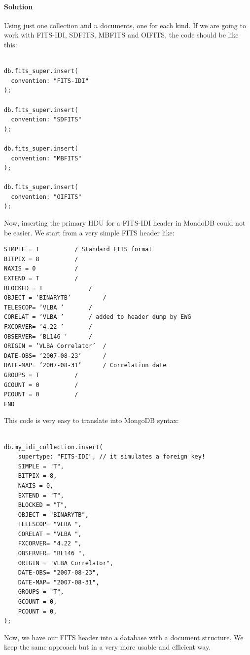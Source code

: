 \paragraph{Solution}

Using just one collection and $n$ documents, one for each kind. If we are going to work with FITS-IDI, SDFITS, MBFITS and OIFITS, the code should be like this:

\begin{lstlisting}

db.fits_super.insert(
  convention: "FITS-IDI"
);

db.fits_super.insert(
  convention: "SDFITS"
);

db.fits_super.insert(
  convention: "MBFITS"
);

db.fits_super.insert(
  convention: "OIFITS"
);

\end{lstlisting}




Now, inserting the primary HDU for a  FITS-IDI header in MondoDB could not be easier. We start from a very simple FITS header like: \newline
\begin{verbatim}
SIMPLE = T 			/ Standard FITS format
BITPIX = 8 			/
NAXIS = 0 			/
EXTEND = T 			/
BLOCKED = T 			/
OBJECT = ’BINARYTB’ 		/
TELESCOP= ’VLBA ’ 		/
CORELAT = ’VLBA ’ 		/ added to header dump by EWG
FXCORVER= ’4.22 ’ 		/
OBSERVER= ’BL146 ’ 		/
ORIGIN = ’VLBA Correlator’ 	/
DATE-OBS= ’2007-08-23’ 		/
DATE-MAP= ’2007-08-31’ 		/ Correlation date
GROUPS = T 			/
GCOUNT = 0 			/
PCOUNT = 0 			/
END
\end{verbatim}

This code is very easy to translate into MongoDB syntax: \newline

\begin{lstlisting}

db.my_idi_collection.insert(
    supertype: "FITS-IDI", // it simulates a foreign key!
    SIMPLE = "T",
    BITPIX = 8,
    NAXIS = 0,
    EXTEND = "T",
    BLOCKED = "T",
    OBJECT = "BINARYTB",
    TELESCOP= "VLBA ",
    CORELAT = "VLBA ",
    FXCORVER= "4.22 ",
    OBSERVER= "BL146 ",
    ORIGIN = "VLBA Correlator",
    DATE-OBS= "2007-08-23",
    DATE-MAP= "2007-08-31",
    GROUPS = "T",
    GCOUNT = 0,
    PCOUNT = 0,
);

\end{lstlisting}

Now, we have our FITS header into a database with a document structure. We keep the same approach but in a very more usable and efficient way.



